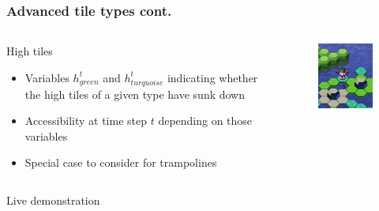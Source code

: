 \begin{frame}
	\frametitle{Advanced tile types cont.}
	\begin{columns}
		\begin{column}{7cm}
			\begin{block}{High tiles}
				\begin{itemize}
					\item Variables $h_{green}^t$ and $h_{turquoise}^t$
						  indicating whether the high tiles of a given type
						  have sunk down
					\pause
					\item Accessibility at time step $t$ depending on those
						  variables
					\pause
					\item Special case to consider for trampolines
				\end{itemize}
			\end{block}
		\end{column}

		\begin{column}{5cm}
			\begin{figure}
				\centering
				\includegraphics[width=5cm]{images/hexahop.png}
			\end{figure}
		\end{column}
	\end{columns}
\end{frame}

\begin{frame}
	\centering
	\hfill \Large Live demonstration \hfill\hfill
\end{frame}
